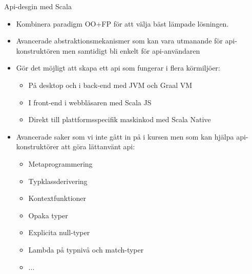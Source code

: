 \begin{Slide}{Api-desgin med Scala}
\begin{itemize}\SlideFontSmall
\item Kombinera paradigm OO+FP för att välja bäst lämpade lösningen.
\item Avancerade abstraktionsmekanismer som kan vara utmanande för api-konstruktören men samtidigt bli enkelt för api-användaren
\item Gör det möjligt att skapa ett api som fungerar i flera körmiljöer:
   \begin{itemize}\SlideFontTiny
   \item På desktop och i back-end med JVM och Graal VM
   \item I front-end i webbläsaren med Scala JS
   \item Direkt till plattformsspecifik maskinkod med Scala Native
   \end{itemize}
\item Avancerade saker som vi inte gått in på i kursen men som kan hjälpa api-konstruktörer att göra lättanvänt api:
   \begin{itemize}\SlideFontTiny
   \item Metaprogrammering
   \item Typklassderivering
   \item Kontextfunktioner
   \item Opaka typer
   \item Explicita null-typer
   \item Lambda på typnivå och match-typer
   \item ...
\end{itemize}
\end{itemize}

\end{Slide}



